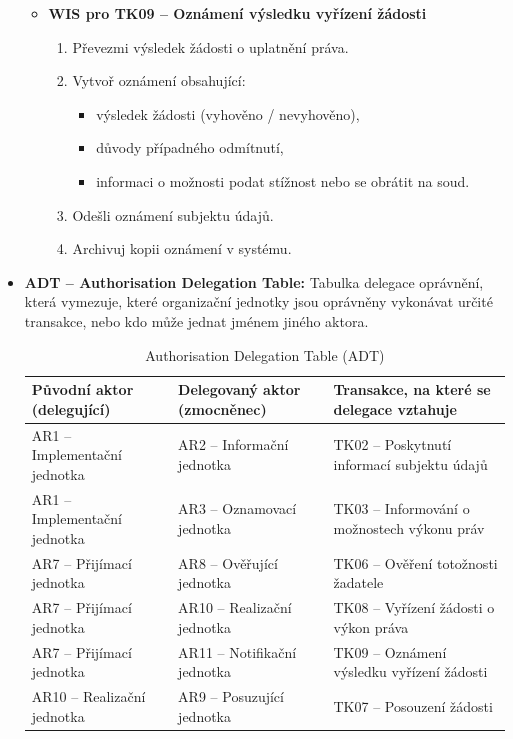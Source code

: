 \begin{itemize}
\begin{itemize}
  \item \textbf{WIS pro TK09 – Oznámení výsledku vyřízení žádosti}
  \begin{enumerate}
    \item Převezmi výsledek žádosti o uplatnění práva.
    \item Vytvoř oznámení obsahující:
    \begin{itemize}
      \item výsledek žádosti (vyhověno / nevyhověno),
      \item důvody případného odmítnutí,
      \item informaci o možnosti podat stížnost nebo se obrátit na soud.
    \end{itemize}
    \item Odešli oznámení subjektu údajů.
    \item Archivuj kopii oznámení v systému.
  \end{enumerate}
  \end{itemize}
  

  \item \textbf{ADT – Authorisation Delegation Table:} Tabulka delegace oprávnění, která vymezuje, které organizační jednotky jsou oprávněny vykonávat určité transakce, nebo kdo může jednat jménem jiného aktora.
  
  \begin{table}[H]
    \centering
    \renewcommand{\arraystretch}{1.3}
    \begin{tabular}{|p{4cm}|p{4cm}|p{4cm}|}
    \hline
    \textbf{Původní aktor (delegující)} & \textbf{Delegovaný aktor (zmocněnec)} & \textbf{Transakce, na které se delegace vztahuje} \\
    \hline
    AR1 – Implementační jednotka & AR2 – Informační jednotka & TK02 – Poskytnutí informací subjektu údajů \\
    \hline
    AR1 – Implementační jednotka & AR3 – Oznamovací jednotka & TK03 – Informování o možnostech výkonu práv \\
    \hline
    AR7 – Přijímací jednotka & AR8 – Ověřující jednotka & TK06 – Ověření totožnosti žadatele \\
    \hline
    AR7 – Přijímací jednotka & AR10 – Realizační jednotka & TK08 – Vyřízení žádosti o výkon práva \\
    \hline
    AR7 – Přijímací jednotka & AR11 – Notifikační jednotka & TK09 – Oznámení výsledku vyřízení žádosti \\
    \hline
    AR10 – Realizační jednotka & AR9 – Posuzující jednotka & TK07 – Posouzení žádosti \\
    \hline
    \end{tabular}
    \caption{Authorisation Delegation Table (ADT)}
  \end{table}
    
    
\end{itemize}


